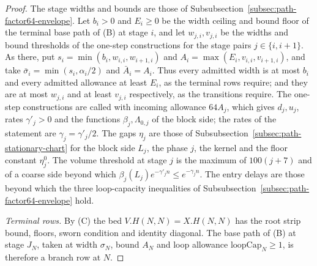\begin{proof}
The stage widths and bounds are those of
Subsubsection~\ref{subsec:path-factor64-envelope}. Let $b_i>0$ and
$E_i\ge0$ be the width ceiling and bound floor of the terminal base
path of \textup{(B)} at stage $i$, and let $w_{j,i},v_{j,i}$ be the
widths and bound thresholds of the one-step constructions for the
stage pairs $j\in\{i,i+1\}$. As there, put
$s_i=\min(b_i,w_{i,i},w_{i+1,i})$ and
$A_i=\max(E_i,v_{i,i},v_{i+1,i})$, and take
$\bar\sigma_i=\min(s_i,\alpha_i/2)$ and $\bar A_i=A_i$. Thus
every admitted width is at most $b_i$ and every admitted allowance
at least $E_i$, as the terminal rows require; and they are at most
$w_{j,i}$ and at least $v_{j,i}$ respectively, as the transitions
require.
The one-step constructions are called with incoming allowance
$64A_j$, which gives $d_j,u_j$, rates $\gamma'_j>0$ and the functions
$\beta_j,\Lambda_{0,j}$ of the block side; the rates of the
statement are $\gamma_j=\gamma'_j/2$. The gaps
$\eta_j$ are those of Subsubsection~\ref{subsec:path-stationary-chart} for
the block side $L_j$, the phase $j$, the kernel and the floor constant
$\eta^0_j$. The volume threshold at stage $j$ is the maximum of
$100(j+7)$ and of a coarse side beyond which
$\beta_j(L_j)e^{-\gamma'_jn}\le e^{-\gamma_jn}$. The entry delays are those beyond which the three
loop-capacity inequalities of
Subsubsection~\ref{subsec:path-factor64-envelope} hold.

\emph{Terminal rows.} By \textup{(C)} the bed $V.H(N,N)=X.H(N,N)$ has
the root strip bound, floors, sworn condition and identity diagonal.
The base path of \textup{(B)} at stage $J_N$, taken at width $\sigma_N$,
bound $A_N$ and loop allowance $\mathrm{loopCap}_N\ge1$, is therefore a
branch row at $N$.


\end{proof}
